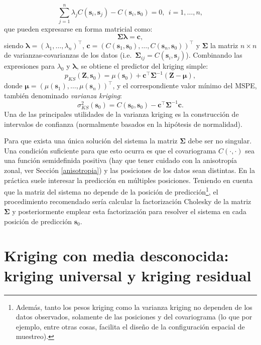 \documentclass[
  spanish,
]{book}
\theoremstyle{break}
\theoremstyle{definition}
\theoremstyle{definition}
\theoremstyle{definition}
\theoremstyle{definition}
\theoremstyle{remark}
\begin{document}
\[\sum\limits_{j=1}^{n}\lambda_{j} C(\mathbf{s}_{i},\mathbf{s}_{j} )
- C(\mathbf{s}_{i},\mathbf{s}_{0})=0, \ \
i=1, \ldots, n,\]
que pueden expresarse en forma matricial como:
\[\boldsymbol{\Sigma}\boldsymbol{\lambda}=\mathbf{c},\]
siendo \(\boldsymbol{\lambda} = \left(\lambda_{1}, \ldots, \lambda_{n}\right)^\top\), \(\mathbf{c}=\left( C(\mathbf{s}_{1},\mathbf{s}_{0}), \ldots,C(\mathbf{s}_{n}, \mathbf{s}_{0})\right)^\top\) y \(\boldsymbol{\Sigma}\) la matriz \(n\times n\) de varianzas-covarianzas de los datos (i.e.~\(\boldsymbol{\Sigma}_{ij} =C(\mathbf{s}_{i},\mathbf{s}_{j} )\)).
Combinando las expresiones para \(\lambda_{0}\) y \(\boldsymbol{\lambda}\), se obtiene el predictor del kriging simple:
\[p_{KS}(\mathbf{Z}, \mathbf{s}_{0}) = \mu(\mathbf{s}_{0}) + \mathbf{c^\top }\boldsymbol{\Sigma}^{-1} (\mathbf{Z}-\boldsymbol{\mu}),\]
donde \(\boldsymbol{\mu}=\left( \mu(\mathbf{s}_{1}), \ldots,\mu(\mathbf{s}_{n} )\right)^\top\), y el correspondiente valor mínimo del MSPE, también denominado \emph{varianza kriging}:
\[\sigma_{KS}^{2} (\mathbf{s}_{0})=C(\mathbf{s}_{0},\mathbf{s}_{0}
)-\mathbf{c^\top }\boldsymbol{\Sigma}^{-1} \mathbf{c}.\]
Una de las principales utilidades de la varianza kriging es la construcción de intervalos de confianza (normalmente basados en la hipótesis de normalidad).

Para que exista una única solución del sistema la matriz \(\boldsymbol{\Sigma}\) debe ser no singular.
Una condición suficiente para que esto ocurra es que el covariograma \(C(\cdot ,\cdot)\) sea una función semidefinida positiva (hay que tener cuidado con la anisotropía zonal, ver Sección \ref{anisotropia}) y las posiciones de los datos sean distintas.
En la práctica suele interesar la predicción en múltiples posiciones.
Teniendo en cuenta que la matriz del sistema no depende de la posición
de predicción\footnote{Además, tanto los pesos kriging como la varianza kriging no dependen de los datos observados, solamente de las posiciones y del covariograma (lo que por ejemplo, entre otras cosas, facilita el diseño de la configuración espacial de muestreo).}, el procedimiento recomendado sería calcular la factorización Cholesky de la matriz \(\boldsymbol{\Sigma}\) y posteriormente emplear esta factorización para resolver el sistema en cada posición de predicción \(\mathbf{s}_{0}\).

\hypertarget{kuniversal}{%
\section{Kriging con media desconocida: kriging universal y kriging residual}\label{kuniversal}}
\end{document}
